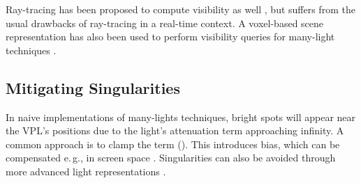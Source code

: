 Ray-tracing has been proposed to compute visibility as well \citep[e.\,g.,][]{segovia2006bidirectional}, but suffers from the usual drawbacks of ray-tracing in a real-time context. A voxel-based scene representation has also been used to perform visibility queries for many-light techniques \citep{sun2015manylightsSVO}.


\subsection{Mitigating Singularities}
\label{sec:intro:relatedWorkManyLight:singularities}

In naive implementations of many-lights techniques, bright spots will appear near the VPL’s positions due to the light’s attenuation term approaching infinity. A common approach is to clamp the term (). This introduces bias, which can be compensated e.\,g., in screen space \citep{novak2011screen}. Singularities can also be avoided through more advanced light representations \citep{tokuyoshi2015vsgl}.


\cleardoublepage
